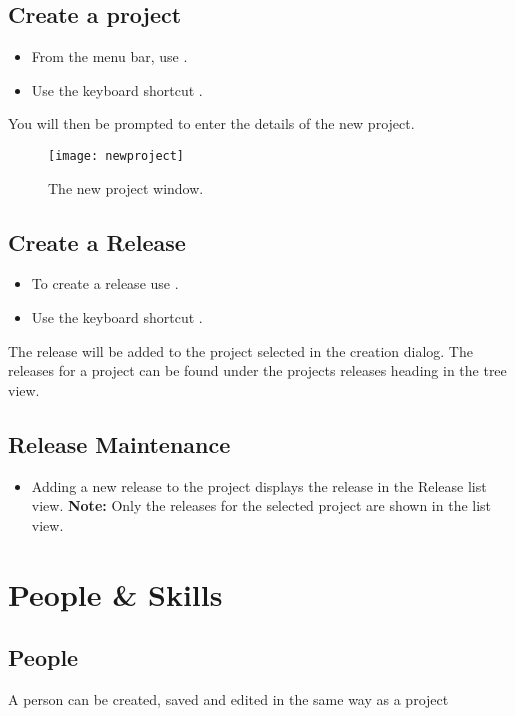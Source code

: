 \documentclass[11pt,fleqn]{book} %
\begin{document}
\subsection{Create a project}
    \begin{itemize}
        \item From the menu bar, use .
        \item Use the keyboard shortcut .
    \end{itemize}
    You will then be prompted to enter the details of the new project.

    \begin{figure}[h]
        \centering
        \texttt{[image: newproject]}
        \caption{The new project window.\label{newproject}}
    \end{figure}

\subsection{Create a Release}
    \begin{itemize}
        \item To create a release use .
        \item Use the keyboard shortcut .
    \end{itemize}
    The release will be added to the project selected in the creation dialog.
    The releases for a project can be found under the projects releases heading in the tree view.

\subsection{Release Maintenance}
\begin{itemize}
  \item Adding a new release to the project displays the release in the Release list view.
    \textbf{Note:} Only the releases for the selected project are shown in the list view.
\end{itemize}

\section{People \& Skills}
\subsection{People}
A person can be created, saved and edited in the same way as a project
\end{document}
